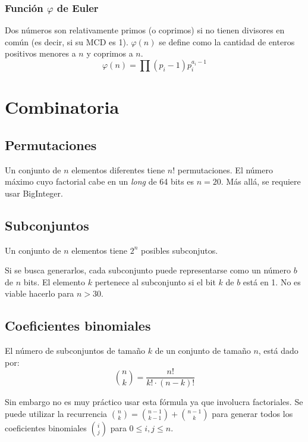 \documentclass{article}
\begin{document}
\begin{multicols}{2}
		\subsubsection{Función $\varphi$ de Euler}
		Dos números son relativamente primos (o coprimos) si no tienen divisores en común (es decir, si su MCD es 1). \( \varphi (n) \) se define como la cantidad de enteros positivos menores a \( n \) y coprimos a \( n \). 
		\[ 
			\varphi (n) = \prod (p_{i} - 1) p_{i}^{a_{i}-1}
		\]

\section{Combinatoria}

	\subsection{Permutaciones}
	Un conjunto de \( n \) elementos diferentes tiene \( n! \) permutaciones. El número máximo cuyo factorial cabe en un \emph{long} de 64 bits es \( n = 20 \). Más allá, se requiere usar BigInteger.

\subsection{Subconjuntos}
	Un conjunto de \( n \) elementos tiene \( 2^{n} \) posibles subconjutos. 

	Si se busca generarlos, cada subconjunto puede representarse como un número \( b \) de \( n \) bits. El elemento \( k \) pertenece al subconjunto si el bit \( k \) de \( b \) está en 1. No es viable hacerlo para \( n > 30 \).
	

	\subsection{Coeficientes binomiales}
	El número de subconjuntos de tamaño \( k \) de un conjunto de tamaño \( n \), está dado por:
	\[ 
		\binom{n}{k} = \frac{n!}{k! \cdot (n-k)!} 
	\]

	Sin embargo no es muy práctico usar esta fórmula ya que involucra factoriales. Se puede utilizar la recurrencia \( \binom{n}{k} = \binom{n-1}{k-1} + \binom{n-1}{k} \) para generar todos los coeficientes binomiales \( \binom{i}{j} \) para \( 0 \leq i,j \leq n \).

	


\end{multicols}
\end{document}
